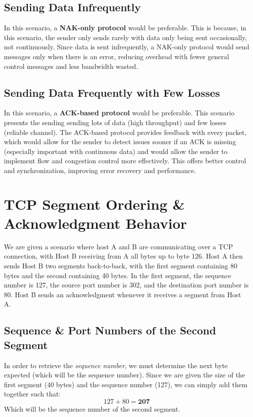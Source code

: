 \documentclass{article}
\begin{document}
\subsection{Sending Data Infrequently}
In this scenario, a \textbf{NAK-only protocol} would be preferable. This is because, in this scenario, the sender only sends rarely with data only being sent occasionally, not continuously. Since data is sent infrequently, a NAK-only protocol would send messages only when there is an error, reducing overhead with fewer general control messages and less bandwidth wasted. 
\subsection{Sending Data Frequently with Few Losses}
In this scenario, a \textbf{ACK-based protocol} would be preferable. This scenario presents the sending sending lots of data (high throughput) and few losses (reliable channel). The ACK-based protocol provides feedback with every packet, which would allow for the sender to detect issues sooner if an ACK is missing (especially important with continuous data) and would allow the sender to implement flow and congestion control more effectively. This offers better control and synchronization, improving error recovery and performance.

\setcounter{section}{26}
\section{TCP Segment Ordering \& Acknowledgment Behavior}
We are given a scenario where host A and B are communicating over a TCP connection, with Host B receiving from A all bytes up to byte 126. Host A then sends Host B two segments back-to-back, with the first segment containing 80 bytes and the second containing 40 bytes. In the first segment, the sequence number is 127, the source port number is 302, and the destination port number is 80. Host B sends an acknowledgment whenever it receives a segment from Host A.
\subsection{Sequence \& Port Numbers of the Second Segment}
In order to retrieve the \textit{sequence number}, we must determine the next byte expected (which will be the sequence number). Since we are given the size of the first segment (40 bytes) and the sequence number (127), we can simply add them together such that:
\[
127 + 80 = \textbf{207}
\]
Which will be the sequence number of the second segment. \\
\end{document}
